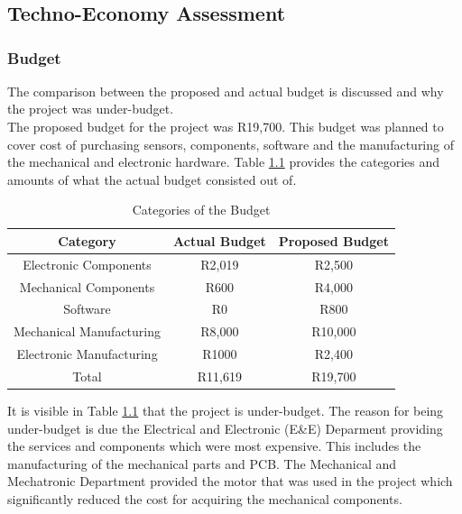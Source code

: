 \chapter{}


\section{Techno-Economy Assessment}
\label{sec:techno_eco}

\subsection{Budget}
The comparison between the proposed and actual budget is discussed and why the project was under-budget.\\

The proposed budget for the project was R19,700. This budget was planned to cover cost of purchasing sensors, components, software and the manufacturing of the mechanical and electronic hardware. Table \ref{table:budget} provides the categories and amounts of what the actual budget consisted out of.\\

\begin{table}[h]
	\centering
	\begin{tabular}{|c|c|c|}
		\hline
		Category & Actual Budget & Proposed Budget \\
		\hline
		\hline
		Electronic Components & R2,019 & R2,500\\
		\hline
		Mechanical Components & R600 & R4,000\\
		\hline 
		Software & R0 & R800\\
		\hline
		Mechanical Manufacturing & R8,000 & R10,000\\
		\hline
		Electronic Manufacturing & R1000 & R2,400\\
		\hline
		\hline 
		Total & R11,619 & R19,700\\
		\hline
		
	\end{tabular}
	\caption{Categories of the Budget }
	\label{table:budget}
	
\end{table}

It is visible in Table \ref{table:budget} that the project is under-budget. The reason for being under-budget is due the Electrical and Electronic (E\&E) Deparment providing the services and components which were most expensive. This includes the manufacturing of the mechanical parts and PCB. The Mechanical and Mechatronic Department provided the motor that was used in the project which significantly reduced the cost for acquiring the mechanical components.


